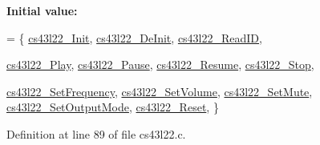 {\bfseries Initial value\+:}
\begin{DoxyCode}
= 
\{
  \mbox{\hyperlink{group___c_s43_l22___private___functions_ga47b373a281c7ba0ea0fac752f3d0a903}{cs43l22\_Init}},
  \mbox{\hyperlink{group___c_s43_l22___private___functions_gaeba1251bafcbeacb591dfe8cb8175447}{cs43l22\_DeInit}},
  \mbox{\hyperlink{group___c_s43_l22___private___functions_gad4e4e8b889500f0e64c546a31d4b6dca}{cs43l22\_ReadID}},

  \mbox{\hyperlink{group___c_s43_l22___private___functions_ga1a210c3782b3d56db00565d4699f4c89}{cs43l22\_Play}},
  \mbox{\hyperlink{group___c_s43_l22___private___functions_gafc49ea6a76539430cd303849b60ae38d}{cs43l22\_Pause}},
  \mbox{\hyperlink{group___c_s43_l22___private___functions_ga579c0ef6455060e9117632f8d83d606a}{cs43l22\_Resume}},
  \mbox{\hyperlink{group___c_s43_l22___private___functions_gabddd9aca1e7c5cdf636556cc02b4d82e}{cs43l22\_Stop}},  
  
  \mbox{\hyperlink{group___c_s43_l22___private___functions_ga1ea4920e35f5e5f903870a50b53bc719}{cs43l22\_SetFrequency}},  
  \mbox{\hyperlink{group___c_s43_l22___private___functions_ga9cd060bb226e44065ec50c7803041114}{cs43l22\_SetVolume}},
  \mbox{\hyperlink{group___c_s43_l22___private___functions_gaed17c2b64d79830afa43b5a45b159286}{cs43l22\_SetMute}},  
  \mbox{\hyperlink{group___c_s43_l22___private___functions_gaad55b2ed28b599b34f4bfe50df745f0d}{cs43l22\_SetOutputMode}},
  \mbox{\hyperlink{group___c_s43_l22___private___functions_ga647488feb466972a5557a2fe2e9350e7}{cs43l22\_Reset}},
\}
\end{DoxyCode}


Definition at line 89 of file cs43l22.\+c.

